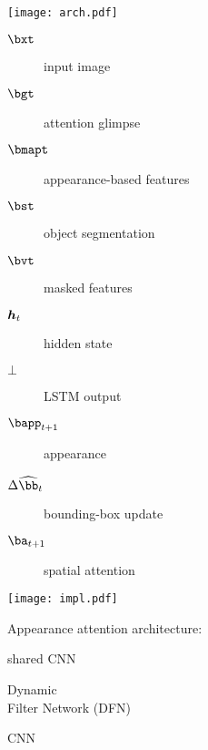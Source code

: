 
\vspace{.5\baselineskip}

\begin{minipage}[c]{0.3\textwidth}
    \centering
    \texttt{[image: arch.pdf]}
    
    \begin{minipage}[c]{0.5\textwidth}
        \begin{description}
            \item[$\bxt$] input image
            \item[$\bgt$] attention glimpse
            \item[$\bmapt$] appearance-based features
            \item[$\bst$] object segmentation
            \item[$\bvt$] masked features
        \end{description}
    \end{minipage}\hfill
    \begin{minipage}[c]{0.5\textwidth}
                \begin{description}
            \item[$\B{h}_t$] hidden state
            \item[$\bot$] LSTM output
            \item[$\bapp_{t+1}$] appearance
            \item[$\Delta \widehat{\bb}_t$] bounding-box update
            \item[$\ba_{t+1}$] spatial attention
        \end{description}
    \end{minipage}
    
\end{minipage}\hfill

\begin{minipage}{0.3\textwidth}
   \vspace{2em}
   \begin{minipage}[c]{0.5\textwidth}
       \centering
       \texttt{[image: impl.pdf]}
   \end{minipage}\hfill
    \begin{minipage}{0.6\textwidth}
    Appearance attention architecture:
    \vspace{1em}
    \begin{description}[leftmargin=\parindent]
        \item[V1] shared CNN
        \item[Dorsal Stream] Dynamic\\ Filter Network (DFN)
        \item[Ventral Stream] CNN
    \end{description}
    \end{minipage}
\end{minipage}

\vspace{\baselineskip}